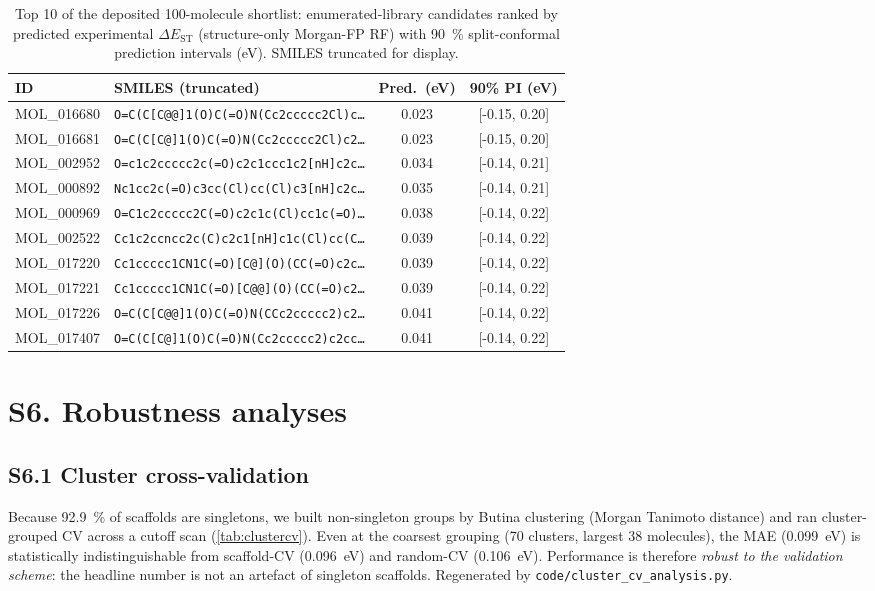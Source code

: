 \documentclass[twoside,twocolumn,9pt]{extarticle}
\begin{document}
\begin{table}[htbp]
  \centering
  \caption{Top \num{10} of the deposited \num{100}-molecule shortlist: enumerated-library
    candidates ranked by predicted experimental $\Delta E_\text{ST}$ (structure-only
    Morgan-FP RF) with \qty{90}{\percent} split-conformal prediction intervals (eV).
    SMILES truncated for display.}
  \label{tab:shortlist}
  \scriptsize
  \begin{tabular}{llcc}
    \toprule
    ID & SMILES (truncated) & Pred.\ (eV) & 90\% PI (eV) \\
    \midrule
    MOL\_016680 & \texttt{O=C(C[C@@]1(O)C(=O)N(Cc2ccccc2Cl)c…} & 0.023 & [-0.15, 0.20] \\
    MOL\_016681 & \texttt{O=C(C[C@]1(O)C(=O)N(Cc2ccccc2Cl)c2…} & 0.023 & [-0.15, 0.20] \\
    MOL\_002952 & \texttt{O=c1c2ccccc2c(=O)c2c1ccc1c2[nH]c2c…} & 0.034 & [-0.14, 0.21] \\
    MOL\_000892 & \texttt{Nc1cc2c(=O)c3cc(Cl)cc(Cl)c3[nH]c2c…} & 0.035 & [-0.14, 0.21] \\
    MOL\_000969 & \texttt{O=C1c2ccccc2C(=O)c2c1c(Cl)cc1c(=O)…} & 0.038 & [-0.14, 0.22] \\
    MOL\_002522 & \texttt{Cc1c2ccncc2c(C)c2c1[nH]c1c(Cl)cc(C…} & 0.039 & [-0.14, 0.22] \\
    MOL\_017220 & \texttt{Cc1ccccc1CN1C(=O)[C@](O)(CC(=O)c2c…} & 0.039 & [-0.14, 0.22] \\
    MOL\_017221 & \texttt{Cc1ccccc1CN1C(=O)[C@@](O)(CC(=O)c2…} & 0.039 & [-0.14, 0.22] \\
    MOL\_017226 & \texttt{O=C(C[C@@]1(O)C(=O)N(CCc2ccccc2)c2…} & 0.041 & [-0.14, 0.22] \\
    MOL\_017407 & \texttt{O=C(C[C@]1(O)C(=O)N(Cc2ccccc2)c2cc…} & 0.041 & [-0.14, 0.22] \\
    \bottomrule
  \end{tabular}
\end{table}

\section*{S6. Robustness analyses}

\subsection*{S6.1 Cluster cross-validation}
Because \qty{92.9}{\percent} of scaffolds are singletons, we built non-singleton groups
by Butina clustering (Morgan Tanimoto distance) and ran cluster-grouped CV across a
cutoff scan (\cref{tab:clustercv}). Even at
the coarsest grouping (\num{70} clusters, largest \num{38} molecules), the MAE
(\qty{0.099}{\electronvolt}) is statistically indistinguishable from scaffold-CV
(\qty{0.096}{\electronvolt}) and random-CV (\qty{0.106}{\electronvolt}). Performance is
therefore \emph{robust to the validation scheme}: the headline number is not an artefact of
singleton scaffolds. Regenerated by \texttt{code/cluster\_cv\_analysis.py}.
\end{document}
